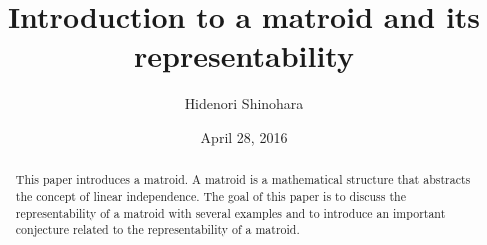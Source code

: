 \documentclass[psamsfonts]{amsart}
\title{Introduction to a matroid and its representability}
\author{Hidenori Shinohara}
\date{April 28, 2016}
\theoremstyle{definition}
\theoremstyle{remark}
\numberwithin{equation}{section}
\begin{document}
\begin{abstract}
This paper introduces a matroid. 
A matroid is a mathematical structure that abstracts the concept of linear independence.
The goal of this paper is to discuss the representability of a matroid with several examples and to introduce an important conjecture related to the representability of a matroid.
\end{abstract}

\maketitle











\end{document}
